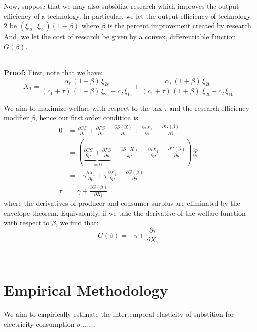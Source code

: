 \documentclass[11pt,a4paper]{extarticle}
\newenvironment{proof}[1][Proof]{\noindent\textbf{#1:} }{\ \rule{0.5em}{0.5em}}
\begin{document}
Now, suppose that we may also subsidize research which improves the output efficiency of a technology. In particular, we let the output efficiency of technology 2 be $(\xi_{2t}, \, \xi_{2s})(1 + \beta)$ where $\beta$ is the percent improvement created by research. And, we let the cost of research be given by a convex, differentiable function $G(\beta)$. 


\hfill \\
\begin{proof} First, note that we have:
	$$X_1 = \dfrac{\alpha _{t}\,(1+\beta) \, \xi_{\mathrm{2s}}}{(c_{1}+ \tau)\,(1+\beta)\,\xi _{\mathrm{2s}}-c_{2}\,\xi _{\mathrm{1s}}}+\dfrac{\alpha _{s}\,(1+\beta)\,\xi _{\mathrm{2t}}}{(c_{1}+ \tau)\,(1+\beta)\,\,\xi _{\mathrm{2t}}-c_{2}\,\xi _{\mathrm{1t}}}$$		
	
	We aim to maximize welfare with respect to the tax $\tau$ and the research efficiency modifier $\beta$, hence our first order condition is:
	\begin{align*}
	0 	 &= \frac{\partial CS}{\partial \tau} + \frac{\partial PS}{\partial \tau} - \frac{\partial S(X)}{\partial \tau} + \frac{\partial \tau X_1}{\partial \tau}  - \frac{\partial G(\beta)}{\partial \beta}\\
	&=  \left( \underbrace{\frac{\partial CS}{\partial p}  + \frac{\partial PS}{\partial p}}_{= 0} - \frac{ \partial  S(X)}{\partial p} + \frac{\partial \tau X_1}{\partial p} - \frac{\partial G(\beta)}{\partial p} \right) \frac{\partial p}{\partial \tau} \\
	&=  - \gamma \frac{\partial  X_1}{\partial p} + \tau \frac{\partial  X_1}{\partial p} - \frac{\partial G(\beta)}{\partial p} \\
	\tau &= \gamma + \frac{\partial G(\beta)}{\partial X_1}
	\end{align*}
	where the derivatives of producer and consumer surplus are eliminated by the envelope theorem. Equivalently, if we take the derivative of the welfare function with respect to $\beta$, we find that:
	$$G(\beta) = -\gamma + \frac{\partial \tau}{\partial X_1}$$
	\hfill
\end{proof}

\pagebreak



\section{Empirical Methodology}

We aim to empirically estimate the intertemporal elasticity of substition for electricity consumption $\sigma$........
\end{document}
